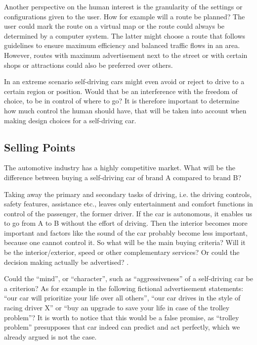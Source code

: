 Another perspective on the human interest is the granularity of the settings or configurations given to the user. How for example will a route be planned? The user could mark the route on a virtual map or the route could always be determined by a computer system. The latter might choose a route that follows guidelines to ensure maximum efficiency and balanced traffic flows in an area. However, routes with maximum advertisement next to the street or with certain shops or attractions could also be preferred over others. 

In an extreme scenario self-driving cars might even avoid or reject to drive to a certain region or position. Would that be an interference with the freedom of choice, to be in control of where to go? It is therefore important to determine how much control the human should have, that will be taken into account when making design choices for a self-driving car. 


\subsection{Selling Points}
\label{sec:EAofNONTC:SellingPoints}

The automotive industry has a highly competitive market. What will be the difference between buying a self-driving car of brand A compared to brand B? 

Taking away the primary and secondary tasks of driving, i.e. the driving controls, safety features, assistance etc., leaves only entertainment and comfort functions in control of the passenger, the former driver. If the car is autonomous, it enables us to go from A to B without the effort of driving. Then the interior becomes more important and factors like the sound of the car probably become less important, because one cannot control it. So what will be the main buying criteria? Will it be the interior/exterior, speed or other complementary services? Or could the decision making actually be advertised? .  

Could the \enquote{mind}, or \enquote{character}, such as \enquote{aggressiveness} of a self-driving car be a criterion? As for example in the following fictional advertisement statements: \enquote{our car will prioritize your life over all others}, \enquote{our car drives in the style of racing driver X} or \enquote{buy an upgrade to save your life in case of the trolley problem}? It is worth to notice that this would be a false promise, as \enquote{trolley problem} presupposes that car indeed can predict and act perfectly, which we already argued is not the case.

